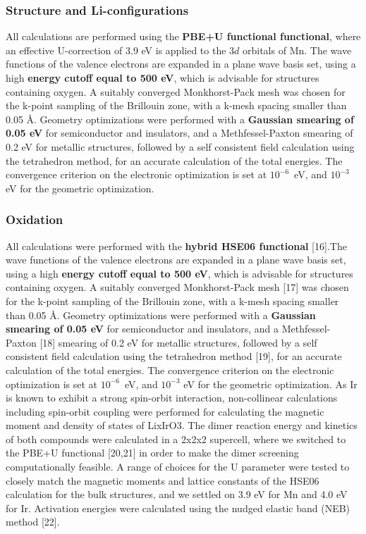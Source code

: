 \begin{refsection}
\subsubsection{Structure and Li-configurations} \label{appendix:sec-structure} 
All calculations are performed using the \textbf{PBE+U functional  
functional}, where an effective U-correction of 3.9 eV is applied to the $3d$ orbitals of 
Mn. The wave functions of the valence electrons are expanded in a plane wave 
basis set, using a high \textbf{energy cutoff equal to 500 eV}, which is 
advisable for structures containing oxygen. A suitably converged 
Monkhorst-Pack mesh was chosen for the k-point sampling of the Brillouin zone, 
with a k-mesh spacing smaller than 0.05 \AA. Geometry optimizations were 
performed with a \textbf{Gaussian smearing of 0.05 eV} for semiconductor and 
insulators, and a Methfessel-Paxton smearing of 0.2 eV for metallic 
structures, followed by a self consistent field calculation using the 
tetrahedron method, for an accurate calculation of the total energies. The 
convergence criterion on the electronic optimization is set at $10^{-6}$~eV, 
and $10^{-3}$ eV for the geometric optimization. 
 
\subsubsection{Oxidation} \label{appendix:sec-oxidation} 
All calculations were performed with the \textbf{hybrid HSE06 functional} 
[16].The wave functions of the valence electrons are expanded in a plane wave 
basis set, using a high \textbf{energy cutoff equal to 500 eV}, which is 
advisable for structures containing oxygen. A suitably converged 
Monkhorst-Pack mesh [17] was chosen for the k-point sampling of the Brillouin 
zone, with a k-mesh spacing smaller than 0.05 \AA. Geometry optimizations were 
performed with a \textbf{Gaussian smearing of 0.05 eV} for semiconductor and 
insulators, and a Methfessel-Paxton [18] smearing of 0.2 eV for metallic 
structures, followed by a self consistent field calculation using the 
tetrahedron method [19], for an accurate calculation of the total energies. 
The convergence criterion on the electronic optimization is set at 
$10^{-6}$~eV, and $10^{-3}$ eV for the geometric optimization. As Ir is known 
to exhibit a strong spin-orbit interaction, non-collinear calculations 
including spin-orbit coupling were performed for calculating the magnetic 
moment and density of states of LixIrO3. The dimer reaction energy and 
kinetics of both compounds were calculated in a 2x2x2 supercell, where we 
switched to the PBE+U functional [20,21] in order to make the dimer screening 
computationally feasible. A range of choices for the U parameter were tested 
to closely match the magnetic moments and lattice constants of the HSE06 
calculation for the bulk structures, and we settled on 3.9 eV for Mn and 4.0 
eV for Ir. Activation energies were calculated using the nudged elastic band 
(NEB) method [22].  
 

\end{refsection}
